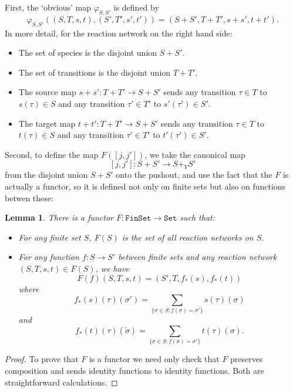 \documentclass{compositionalityarticle}
\newcommand{\FinSet}{\mathtt{FinSet}}
\newcommand{\Set}{\mathtt{Set}}
\newcommand{\maps}{\colon}
\newcommand{\beq}{\begin{equation}}
\newcommand{\eeq}{\end{equation}}
\theoremstyle{compositionality}
\newtheorem{lem}[thm]{Lemma}
\theoremstyle{remark}
\begin{document}
First, the `obvious' map $\varphi_{S,S'}$ is defined by
\beq
\label{eq:Phi}
    \varphi_{S,S'} ((S,T,s,t), (S',T',s',t')) = (S + S', T + T', s+s', t+t').  
\eeq
In more detail, for the reaction network on the right hand side:
\begin{itemize}
\item The set of species is the disjoint union $S + S'$.
\item The set of transitions is the disjoint union $T + T'$.
\item The source map $s + s' \maps T + T' \to S + S'$ sends any transition $\tau \in T$ 
to $s(\tau) \in S$ and any transition $\tau' \in T'$ to $s'(\tau') \in S'$.  
\item The target map $t + t' \maps T + T' \to S + S'$ sends any transition $\tau \in T$ 
to $t(\tau) \in S$ and any transition $\tau' \in T'$ to $t'(\tau') \in S'$.  
\end{itemize}

Second, to define the map $F([j,j'])$, we take the canonical map
\[  [j,j'] \maps S+S' \to S+_Y S' \] 
from the disjoint union $S+S'$ onto the pushout, and use the fact that the
$F$ is actually a functor, so it is defined not only on finite sets but also on functions
betwen these:

\begin{lem}
\label{lemma:RFunctor}
There is a functor $F \maps \FinSet \to \Set$ such that:
\begin{itemize}
\item For any finite set $S$, $F(S)$ is the set of all reaction networks on $S$.
\item For any function $f \maps S \to S'$ between finite sets and any reaction network $(S,T,s,t) \in F(S)$, we have
\[    F(f)(S,T,s,t) = (S',T, f_*(s), f_*(t)) \]
where 
\beq  
f_*(s)(\tau)(\sigma') =\sum_{\{\sigma \in S : f(\sigma) = \sigma' \}} s(\tau)(\sigma)  
\label{stilde}
\eeq
and 
\beq  
f_*(t)(\tau)(\tilde{\sigma}) =\sum_{\{\sigma \in S : f(\sigma) = \sigma' \}} t(\tau)(\sigma) .
\label{ttilde}
\eeq
\end{itemize}
\end{lem}
\begin{proof}
To prove that $F$ is a functor we need only check that $F$ preserves composition
and sends identity functions to identity functions. Both are straightforward calculations.
\end{proof}
\end{document}
